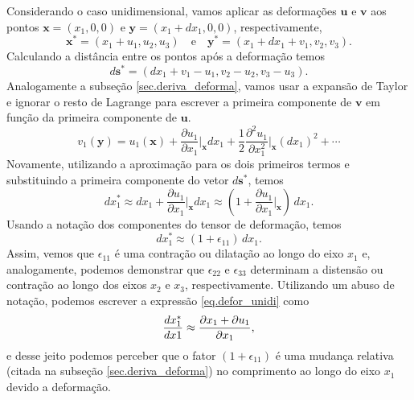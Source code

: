 Considerando o caso unidimensional, vamos aplicar as deforma\c{c}\~oes $\mathbf{u}$ e $\mathbf{v}$ aos pontos $\mathbf{x}=(x_1,0,0)$ e $\mathbf{y}=(x_1+dx_1,0,0)$, respectivamente,
\begin{equation*}
\mathbf{x}^*=(x_1+u_1,u_2,u_3)\quad\text{e}\quad\mathbf{y}^*=(x_1+dx_1+v_1,v_2,v_3).
\end{equation*}
Calculando a dist\^ancia entre os pontos ap\'os a deforma\c{c}\~ao temos
\begin{equation*}
d\mathbf{s}^*=(dx_1+v_1-u_1,v_2-u_2,v_3-u_3).
\end{equation*}
Analogamente a subse\c{c}\~ao \ref{sec.deriva_deforma}, vamos usar a expans\~ao de Taylor e ignorar o resto de Lagrange para escrever a primeira componente de $\mathbf{v}$ em fun\c{c}\~ao da primeira componente de $\mathbf{u}$. 
\begin{equation*}
v_1(\mathbf{y})=u_1(\mathbf{x})+\frac{\partial u_1}{\partial x_1}\Bigg\vert_{\mathbf{x}}dx_1+\frac{1}{2}\frac{\partial^2 u_1}{\partial x_1^2}\Bigg\vert_{\mathbf{x}}(dx_1)^2+\cdots
\end{equation*}
Novamente, utilizando a aproxima\c{c}\~ao para os dois primeiros termos e substituindo a primeira componente do vetor $d\mathbf{s}^*$, temos
\begin{equation}
dx_1^*\approx dx_1+\frac{\partial u_1}{\partial x_1}\Bigg\vert_{\mathbf{x}}dx_1\approx \left(1+\frac{\partial u_1}{\partial x_1}\Bigg\vert_{\mathbf{x}}\right)\,dx_1. 
\end{equation}
Usando a nota\c{c}\~ao dos componentes do tensor de deforma\c{c}\~ao, temos
\begin{equation}\label{eq.defor_unidi}
dx_1^*\approx(1+\epsilon_{11})\,dx_1.
\end{equation} 
Assim, vemos que $\epsilon_{11}$ \'e uma contra\c{c}\~ao ou dilata\c{c}\~ao ao longo do eixo $x_1$ e, analogamente, podemos demonstrar que $\epsilon_{22}$ e $\epsilon_{33}$ determinam a distens\~ao ou contra\c{c}\~ao ao longo dos eixos $x_2$ e $x_3$, respectivamente.
Utilizando um abuso de nota\c{c}\~ao, podemos escrever a express\~ao \ref{eq.defor_unidi} como
\begin{equation*}
\frac{dx_1^*}{dx\-1}\approx \frac{\partial x_1+\partial u_1}{\partial x_1},
\end{equation*}
e desse jeito podemos perceber que o fator $(1+\epsilon_{11})$ \'e uma mudan\c{c}a relativa (citada na subse\c{c}\~ao \ref{sec.deriva_deforma}) no comprimento ao longo do eixo $x_1$ devido a deforma\c{c}\~ao.

